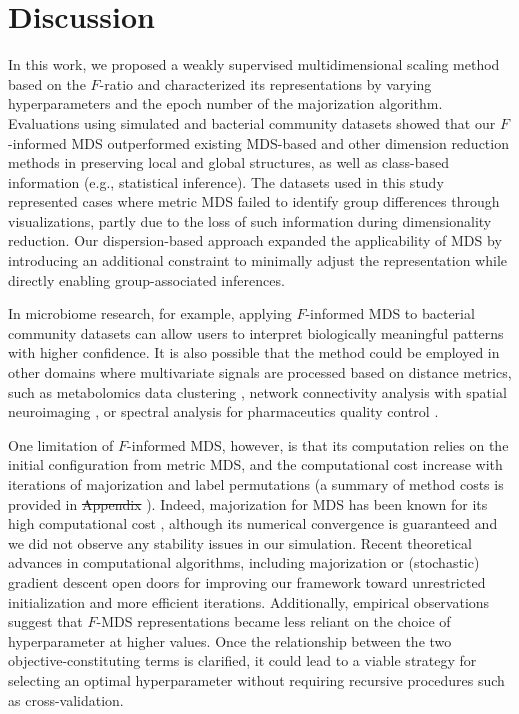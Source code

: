 \documentclass[10pt,letterpaper]{article}
\newcommand{\1}{{\rm 1}\kern-0.24em{\rm I}}
\providecommand{\DIFaddtex}[1]{{\protect\color{blue}\uwave{#1}}} %
\providecommand{\DIFdeltex}[1]{{\protect\color{red}\sout{#1}}}                      %
\providecommand{\DIFaddbegin}{} %
\providecommand{\DIFaddend}{} %
\providecommand{\DIFdelbegin}{} %
\providecommand{\DIFdelend}{} %
\providecommand{\DIFadd}[1]{\texorpdfstring{\DIFaddtex{#1}}{#1}} %
\providecommand{\DIFdel}[1]{\texorpdfstring{\DIFdeltex{#1}}{}} %
\newcommand{\DIFscaledelfig}{0.5}
\newlength{\DIFdelgraphicswidth} %
\newlength{\DIFdelgraphicsheight} %
\newcommand{\DIFaddincludegraphics}[2][]{{\color{blue}\fbox{\DIFOincludegraphics[#1]{#2}}}} %
\newcommand{\DIFdelincludegraphics}[2][]{%
\sbox{\DIFdelgraphicsbox}{\DIFOincludegraphics[#1]{#2}}%
\settoboxwidth{\DIFdelgraphicswidth}{\DIFdelgraphicsbox} %
\settoboxtotalheight{\DIFdelgraphicsheight}{\DIFdelgraphicsbox} %
\scalebox{\DIFscaledelfig}{%
\parbox[b]{\DIFdelgraphicswidth}{\usebox{\DIFdelgraphicsbox}\\[-\baselineskip] \rule{\DIFdelgraphicswidth}{0em}}\llap{\resizebox{\DIFdelgraphicswidth}{\DIFdelgraphicsheight}{%
\setlength{\unitlength}{\DIFdelgraphicswidth}%
\begin{picture}(1,1)%
\thicklines\linethickness{2pt} %
{\color[rgb]{1,0,0}\put(0,0){\framebox(1,1){}}}%
{\color[rgb]{1,0,0}\put(0,0){\line( 1,1){1}}}%
{\color[rgb]{1,0,0}\put(0,1){\line(1,-1){1}}}%
\end{picture}%
}\hspace*{3pt}}} %
} %
\DeclareRobustCommand{\DIFaddbegin}{\DIFOaddbegin \let\includegraphics\DIFaddincludegraphics} %
\DeclareRobustCommand{\DIFaddend}{\DIFOaddend \let\includegraphics\DIFOincludegraphics} %
\DeclareRobustCommand{\DIFdelbegin}{\DIFOdelbegin \let\includegraphics\DIFdelincludegraphics} %
\DeclareRobustCommand{\DIFdelend}{\DIFOaddend \let\includegraphics\DIFOincludegraphics} %
\begin{document}
\section*{Discussion}
In this work, we proposed a weakly supervised multidimensional scaling method based on the $F$-ratio and characterized its representations by varying hyperparameters and the epoch number of the majorization algorithm. Evaluations using simulated and bacterial community datasets showed that our $F$-informed MDS outperformed existing MDS-based and other dimension reduction methods in preserving local and global structures, as well as class-based information (e.g., statistical inference). The datasets used in this study represented cases where metric MDS failed to identify group differences through visualizations, partly due to the loss of such information during dimensionality reduction. Our dispersion-based approach expanded the applicability of MDS by introducing an additional constraint to minimally adjust the representation while directly enabling group-associated inferences.

In microbiome research, for example, applying $F$-informed MDS to bacterial community datasets can allow users to interpret biologically meaningful patterns with higher confidence. It is also possible that the method could be employed in other domains where multivariate signals are processed based on distance metrics, such as metabolomics data clustering \cite{Hansel25}, network connectivity analysis with spatial neuroimaging \cite{Kinsey24}, or spectral analysis for pharmaceutics quality control \cite{Puchert11}.

One limitation of $F$-informed MDS, however, is that its computation relies on the initial configuration from metric MDS, and the computational cost increase with iterations of majorization and label permutations (a summary of method costs is provided in \DIFdelbegin %
\DIFdel{Appendix }\DIFdelend \DIFaddbegin \DIFadd{Appendix F, } \DIFadd{File}\DIFaddend ). Indeed, majorization for MDS has been known for its high computational cost \cite{Fang25}, although its numerical convergence is guaranteed \cite{deleeuw24} and we did not observe any stability issues in our simulation. Recent theoretical advances in computational algorithms, including majorization \cite{Streeter23} or (stochastic) gradient descent \cite{Demaine21, zheng19} open doors for improving our framework toward unrestricted initialization and more efficient iterations. Additionally, empirical observations suggest that $F$-MDS representations became less reliant on the choice of hyperparameter at higher values. Once the relationship between the two objective-constituting terms is clarified, it could lead to a viable strategy for selecting an optimal hyperparameter without requiring recursive procedures such as cross-validation.
\end{document}
